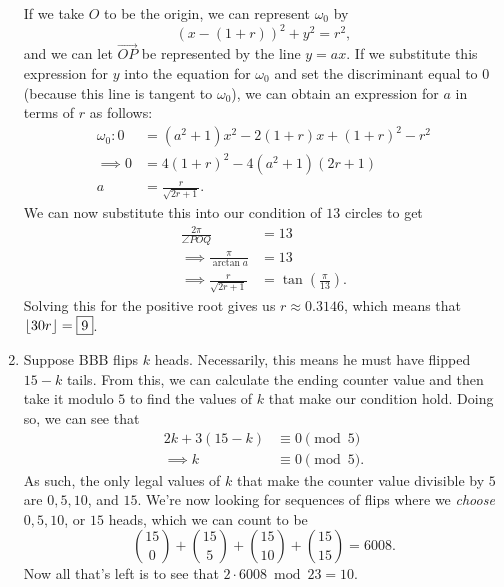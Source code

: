 \begin{enumerate}
    If we take \( O \) to be the origin, we can represent \( \omega_0 \) by
    \[
        \left( x - \left( 1 + r \right) \right)^2 + y^2 = r^2
    ,\]
    and we can let \( \overrightarrow{OP} \) be represented by the line \( y =
    ax \). If we substitute this expression for \( y \) into the equation for
    \( \omega_0 \) and set the discriminant equal to \( 0 \) (because this line
    is tangent to \( \omega_0 \)), we can obtain an expression for \( a \) in
    terms of \( r \) as follows:
    \begin{align*}
        \omega_0 \colon 0 &= \left( a^2 + 1 \right) x^2 - 2 \left( 1 + r \right)x + \left( 1 + r \right)^2 - r^2 \\
        \implies 0 &= 4 \left( 1 + r \right)^2 - 4 \left( a^2 + 1 \right) \left( 2r + 1 \right) \\
        a &= \frac{r}{\sqrt{2r + 1}}
    .\end{align*}
    We can now substitute this into our condition of \( 13 \) circles to get
    \begin{align*}
        \frac{2 \pi}{\angle POQ} &= 13 \\
        \implies \frac{\pi}{\arctan{a}} &= 13 \\
        \implies \frac{r}{\sqrt{2r + 1}} &= \tan{\left( \frac{\pi}{13} \right)}
    .\end{align*}
    Solving this for the positive root gives us \( r \approx 0.3146 \), which means that \( \left\lfloor 30r \right\rfloor = \boxed{9} \).

    \item Suppose BBB  flips \( k \) heads. Necessarily, this means he must
        have flipped \( 15 - k \) tails. From this, we can calculate the ending
        counter value and then take it modulo \( 5 \) to find the values of \(
        k \) that make our condition hold. Doing so, we can see that
        \begin{align*}
            2k + 3 \left( 15 - k \right) &\equiv 0 \pmod{5} \\
            \implies k &\equiv 0 \pmod{5}
        .\end{align*}
        As such, the only legal values of \( k \) that make the counter value
        divisible by \( 5 \) are \( 0, 5, 10 \), and \( 15 \). We're now
        looking for sequences of flips where we \textit{choose} \( 0, 5, 10 \),
        or \( 15 \) heads, which we can count to be
        \[
            \binom{15}{0} + \binom{15}{5} + \binom{15}{10} + \binom{15}{15} = 6008
        .\]
        Now all that's left is to see that \( 2 \cdot 6008 \bmod{23} = \boxed{10} \).


\end{enumerate}
